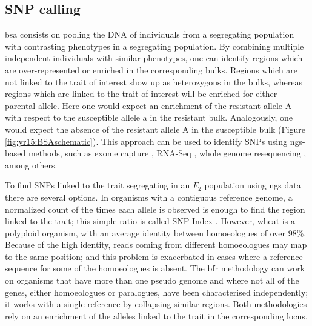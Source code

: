 \subsection{SNP calling}
\gls{bsa} consists on pooling the DNA of individuals from a segregating population with contrasting phenotypes \citep{Michelmore1991} in a segregating population. 
By combining multiple independent individuals with similar phenotypes, one can identify regions which are over-represented or enriched in the corresponding bulks. 
Regions which are not linked to the trait of interest show up as heterozygous in the bulks, whereas regions which are linked to the trait of interest will be enriched for either parental allele.
Here one would expect an enrichment of the resistant allele A with respect to the susceptible allele a in the resistant bulk. 
Analogously, one would expect the absence of the resistant allele A in the susceptible bulk (Figure \ref{fig:yr15:BSAschematic}). 
This approach can be used to identify SNPs using \gls{ngs}-based methods, such as exome capture \citep{Hodges2007}, RNA-Seq \citep{Pickrell2010}, whole genome resequencing \citep{Schneeberger2009}, among others. 

To find SNPs linked to the trait segregating in an $F_{2}$ population using \gls{ngs} data there are several options. 
In organisms with a contiguous reference genome, a normalized count of the times each allele is observed is enough to find the region linked to the trait; this simple ratio is called SNP-Index \citep{Takagi2013a}.
However, wheat is a polyploid organism, with an average identity between homoeologues of over 98\%. 
Because of the high identity, reads coming from different homoeologues may map to the same position; and this problem is exacerbated in cases where a reference sequence for some of the homoeologues is absent. 
The \gls{bfr} \citep{Trick2012} methodology can work on organisms that have more than one pseudo genome and where not all of the genes, either homoeologues or paralogues, have been characterised independently; it works with a single reference by collapsing similar regions. 
Both methodologies rely on an enrichment of the alleles linked to the trait in the corresponding locus. 

